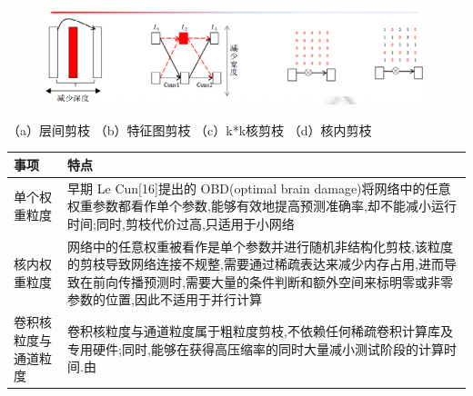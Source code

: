 \begin{figure}
\centering
\includegraphics{./img/ch17/剪枝粒度分类.png}
\caption{}
\end{figure}

（a）层间剪枝 （b）特征图剪枝 （c）k*k核剪枝 （d）核内剪枝

\begin{longtable}[]{ ll }
\toprule
\begin{minipage}[b]{0.24\columnwidth}\raggedright\strut
事项\strut
\end{minipage} & \begin{minipage}[b]{0.70\columnwidth}\raggedright\strut
特点\strut
\end{minipage}\tabularnewline
\midrule
\endhead
\begin{minipage}[t]{0.24\columnwidth}\raggedright\strut
单个权重粒度\strut
\end{minipage} & \begin{minipage}[t]{0.70\columnwidth}\raggedright\strut
早期 Le Cun{[}16{]}提出的 OBD(optimal brain
damage)将网络中的任意权重参数都看作单个参数,能够有效地提高预测准确率,却不能减小运行时间;同时,剪枝代价过高,只适用于小网络\strut
\end{minipage}\tabularnewline
\begin{minipage}[t]{0.24\columnwidth}\raggedright\strut
核内权重粒度\strut
\end{minipage} & \begin{minipage}[t]{0.70\columnwidth}\raggedright\strut
网络中的任意权重被看作是单个参数并进行随机非结构化剪枝,该粒度的剪枝导致网络连接不规整,需要通过稀疏表达来减少内存占用,进而导致在前向传播预测时,需要大量的条件判断和额外空间来标明零或非零参数的位置,因此不适用于并行计算\strut
\end{minipage}\tabularnewline
\begin{minipage}[t]{0.24\columnwidth}\raggedright\strut
卷积核粒度与通道粒度\strut
\end{minipage} & \begin{minipage}[t]{0.70\columnwidth}\raggedright\strut
卷积核粒度与通道粒度属于粗粒度剪枝,不依赖任何稀疏卷积计算库及专用硬件;同时,能够在获得高压缩率的同时大量减小测试阶段的计算时间.由\strut
\end{minipage}\tabularnewline
\bottomrule
\end{longtable}

